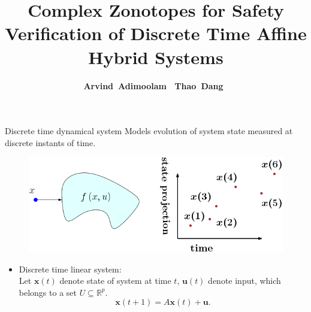 




\title{Complex Zonotopes for Safety Verification of Discrete Time Affine Hybrid Systems}
\author[shortname]{{  \bf \hspace{-1em} Arvind\ Adimoolam~\hspace{1em} Thao\ Dang~}}

\date{}


\maketitle

\begin{frame}{Discrete time dynamical system}
%
Models evolution of system state measured at discrete instants of time.
\begin{figure}
\includegraphics[scale=0.4]{figures/dynamical-system.png}
\end{figure}
%
\begin{itemize}
\item {\color{blue} Discrete time linear system}:\\
Let {\color{purple} $\bm{x}(t)$} denote {\color{blue} state of system}
at time $t$, {\color{purple} $\bm{u}(t)$} denote {\color{blue} input},
which {\color{blue} belongs} to a set {\color{purple}
$U\subseteq \mathbb{R}^p$}.
%
{\color{purple}
\[
\bm{x}(t+1)=A\bm{x}(t)+\bm{u}.
\]
}
\end{itemize}
\end{frame}

